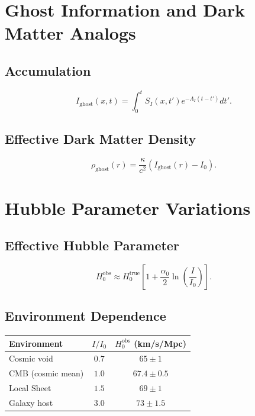 \documentclass[12pt, a4paper]{article}
\begin{document}
\section{Ghost Information and Dark Matter Analogs}

\subsection{Accumulation}

\begin{equation}
    I_{\text{ghost}}(x,t) = \int_0^t S_I(x,t') e^{-\Lambda_I(t-t')} dt'.
\end{equation}

\subsection{Effective Dark Matter Density}

\begin{equation}
    \rho_{\text{ghost}}(r) = \frac{\kappa}{c^2} \left(I_{\text{ghost}}(r) - I_0\right).
\end{equation}


\section{Hubble Parameter Variations}

\subsection{Effective Hubble Parameter}

\begin{equation}
    H_0^{\text{obs}} \approx H_0^{\text{true}} \left[1 + \frac{\alpha_0}{2} \ln\left(\frac{I}{I_0}\right)\right].
\end{equation}

\subsection{Environment Dependence}

\begin{center}
\begin{tabular}{lcc}
\toprule
\textbf{Environment} & $I/I_0$ & $H_0^{\text{obs}}$ (km/s/Mpc) \\
\midrule
Cosmic void & $0.7$ & $65 \pm 1$ \\
CMB (cosmic mean) & $1.0$ & $67.4 \pm 0.5$ \\
Local Sheet & $1.5$ & $69 \pm 1$ \\
Galaxy host & $3.0$ & $73 \pm 1.5$ \\
\bottomrule
\end{tabular}
\end{center}
\end{document}
